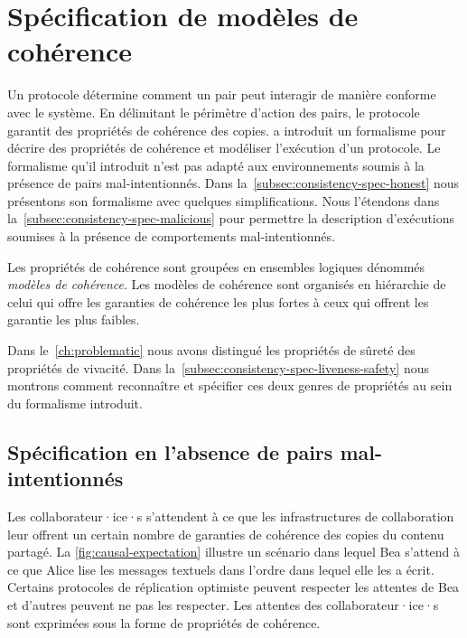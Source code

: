 \section{Spécification de modèles de cohérence}\label{sec:consistency-spec}

Un protocole détermine comment un pair peut interagir de manière conforme avec le système.
En délimitant le périmètre d'action des pairs, le protocole garantit des propriétés de cohérence des copies.
\textcite{burckhardt_eventualconsistency_2014} a introduit un formalisme pour décrire des propriétés de cohérence et modéliser l'exécution d'un protocole.
Le formalisme qu'il introduit n'est pas adapté aux environnements soumis à la présence de pairs mal-intentionnés.
Dans la~\autoref{subsec:consistency-spec-honest} nous présentons son formalisme avec quelques simplifications.
Nous l'étendons dans la~\autoref{subsec:consistency-spec-malicious} pour permettre la description d'exécutions soumises à la présence de comportements mal-intentionnés.

Les propriétés de cohérence sont groupées en ensembles logiques dénommés \emph{modèles de cohérence}.
Les modèles de cohérence sont organisés en hiérarchie de celui qui offre les garanties de cohérence les plus fortes à ceux qui offrent les garantie les plus faibles.

Dans le~\autoref{ch:problematic} nous avons distingué les propriétés de sûreté des propriétés de vivacité.
Dans la~\autoref{subsec:consistency-spec-liveness-safety} nous montrons comment reconnaître et spécifier ces deux genres de propriétés au sein du formalisme introduit.


\subsection{Spécification en l'absence de pairs mal-intentionnés}\label{subsec:consistency-spec-honest}

Les collaborateur·ice·s s'attendent à ce que les infrastructures de collaboration leur offrent un certain nombre de garanties de cohérence des copies du contenu partagé.
La \autoref{fig:causal-expectation} illustre un scénario dans lequel Bea s'attend à ce que Alice lise les messages textuels dans l'ordre dans lequel elle les a écrit.
Certains protocoles de réplication optimiste peuvent respecter les attentes de Bea et d'autres peuvent ne pas les respecter.
Les attentes des collaborateur·ice·s sont exprimées sous la forme de propriétés de cohérence.

